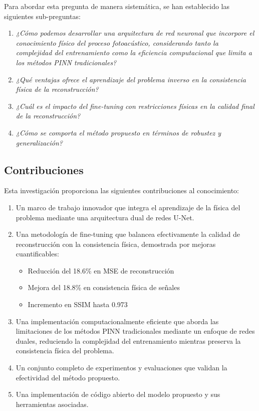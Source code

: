 Para abordar esta pregunta de manera sistemática, se han establecido las siguientes sub-preguntas:

\begin{enumerate}[start=1,label={PI\arabic*:},wide = 0pt, leftmargin = 3em]
\item \textit{¿Cómo podemos desarrollar una arquitectura de red neuronal que incorpore el conocimiento físico del proceso fotoacústico, considerando tanto la complejidad del entrenamiento como la eficiencia computacional que limita a los métodos PINN tradicionales?}
\item \textit{¿Qué ventajas ofrece el aprendizaje del problema inverso en la consistencia física de la reconstrucción?}
\item \textit{¿Cuál es el impacto del fine-tuning con restricciones físicas en la calidad final de la reconstrucción?}
\item \textit{¿Cómo se comporta el método propuesto en términos de robustez y generalización?}
\end{enumerate}

\subsection{Contribuciones}
\label{sec:cont}

Esta investigación proporciona las siguientes contribuciones al conocimiento:

\begin{enumerate}[start=1,label={C\arabic*:},wide = 0pt, leftmargin = 3em]
\item Un marco de trabajo innovador que integra el aprendizaje de la física del problema mediante una arquitectura dual de redes U-Net.
\item Una metodología de fine-tuning que balancea efectivamente la calidad de reconstrucción con la consistencia física, demostrada por mejoras cuantificables:
    \begin{itemize}
        \item Reducción del 18.6\% en MSE de reconstrucción
        \item Mejora del 18.8\% en consistencia física de señales
        \item Incremento en SSIM hasta 0.973
    \end{itemize}
\item Una implementación computacionalmente eficiente que aborda las limitaciones de los métodos PINN tradicionales mediante un enfoque de redes duales, reduciendo la complejidad del entrenamiento mientras preserva la consistencia física del problema.
\item Un conjunto completo de experimentos y evaluaciones que validan la efectividad del método propuesto.
\item Una implementación de código abierto del modelo propuesto y sus herramientas asociadas.
\end{enumerate}

